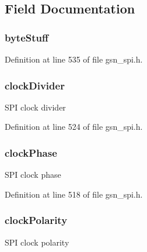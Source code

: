\subsection{Field Documentation}
\hypertarget{a00231_a7607005ffbebdca79ab3c4d558d0e442}{
\subsubsection[{byteStuff}]{ {\bf byteStuff}}}
\label{a00231_a7607005ffbebdca79ab3c4d558d0e442}


Definition at line 535 of file gsn\_\-spi.h.

\hypertarget{a00231_ae7807face22c73f3541066336176a60d}{
\subsubsection[{clockDivider}]{ {\bf clockDivider}}}
\label{a00231_ae7807face22c73f3541066336176a60d}
SPI clock divider 

Definition at line 524 of file gsn\_\-spi.h.

\hypertarget{a00231_a3bf64950c4cb62575d5cc62ca7f0c477}{
\subsubsection[{clockPhase}]{ {\bf clockPhase}}}
\label{a00231_a3bf64950c4cb62575d5cc62ca7f0c477}
SPI clock phase 

Definition at line 518 of file gsn\_\-spi.h.

\hypertarget{a00231_a2fcdd63ffc7b77384ef779ac2bc097f3}{
\subsubsection[{clockPolarity}]{ {\bf clockPolarity}}}
\label{a00231_a2fcdd63ffc7b77384ef779ac2bc097f3}
SPI clock polarity 

